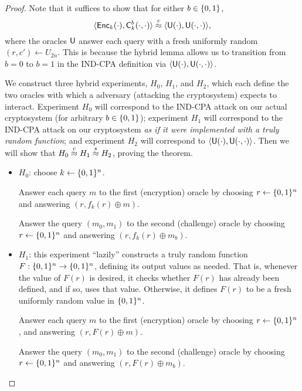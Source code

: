 \documentclass[11pt]{article}
\begin{document}
\begin{proof}
  Note that it suffices to show that for either $b \in \{0,1\}$, \[
  \langle \mathsf{Enc}_{k}(\cdot), \mathsf{C}_{k}^{b}(\cdot, \cdot) \rangle
  \stackrel{c}{\approx} \langle \mathsf{U}(\cdot), \mathsf{U}(\cdot,\cdot) \rangle, \]
  where the oracles $\mathsf{U}$ answer each query with a fresh
  uniformly random $(r,c') \gets U_{2n}$.  This is because the hybrid
  lemma allows us to transition from $b=0$ to $b=1$ in the IND-CPA
  definition via $\langle \mathsf{U}(\cdot), \mathsf{U}(\cdot,\cdot)
  \rangle$.

  We construct three hybrid experiments, $H_{0}$, $H_{1}$, and
  $H_{2}$, which each define the two oracles with which a adversary
  (attacking the cryptosystem) expects to interact.  Experiment
  $H_{0}$ will correspond to the IND-CPA attack on our actual
  cryptosystem (for arbitrary $b \in \{0,1\}$); experiment $H_{1}$ will
  correspond to the IND-CPA attack on our cryptosystem \emph{as if it
    were implemented with a truly random function}; and experiment
  $H_{2}$ will correspond to $\langle \mathsf{U}(\cdot),
  \mathsf{U}(\cdot,\cdot) \rangle$.  Then we will show that $H_{0}
  \stackrel{c}{\approx} H_{1} \stackrel{s}{\approx} H_{2}$, proving the theorem.

  \begin{itemize}
  \item $H_{0}$: choose $k \gets \{0,1\}^{n}$.

    Answer each query $m$ to the first (encryption) oracle by choosing
    $r \gets \{0,1\}^{n}$ and answering $(r, f_{k}(r) \oplus m)$.

    Answer the query $(m_{0}, m_{1})$ to the second (challenge) oracle
    by choosing $r \gets \{0,1\}^{n}$ and answering $(r, f_{k}(r) \oplus
    m_{b})$.

  \item $H_{1}$: this experiment ``lazily'' constructs a truly random
    function $F : \{0,1\}^{n} \to \{0,1\}^{n}$, defining its output values
    as needed.  That is, whenever the value of $F(r)$ is desired, it
    checks whether $F(r)$ has already been defined, and if so, uses
    that value.  Otherwise, it defines $F(r)$ to be a fresh uniformly
    random value in $\{0,1\}^{n}$.

    Answer each query $m$ to the first (encryption) oracle by choosing
    $r \gets \{0,1\}^{n}$, and answering $(r, F(r) \oplus m)$.

    Answer the query $(m_{0}, m_{1})$ to the second (challenge) oracle
    by choosing $r \gets \{0,1\}^{n}$ and answering $(r, F(r) \oplus
    m_{b})$.


\end{itemize}
\end{proof}
\end{document}
